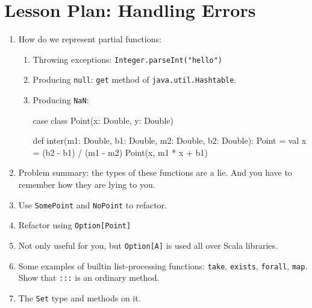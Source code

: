 \documentclass[9pt]{extbook}
\begin{document}
\chapter{Lesson Plan: Handling Errors}

\begin{enumerate}

  \item How do we represent partial functions:
  
    \begin{enumerate}
  
      \item Throwing exceptions: \lstinline|Integer.parseInt("hello")|
  
      \item Producing \lstinline|null|: \lstinline|get| method of
        \lstinline|java.util.Hashtable|.
  
      \item Producing \lstinline|NaN|:
  \begin{scalacode}
   case class Point(x: Double, y: Double)
  
   def inter(m1: Double, b1: Double, m2: Double, b2: Double): Point = {
     val x = (b2 - b1) / (m1 - m2)
     Point(x, m1 * x + b1)
   }
  \end{scalacode}
  
        
    \end{enumerate}
  
    \item Problem summary: the types of these functions are a lie. And
      you have to remember how they are lying to you.
  
    \item Use \lstinline|SomePoint| and \lstinline|NoPoint| to refactor.
  
    \item Refactor using \lstinline|Option[Point]|
  
    \item Not only useful for you, but \lstinline|Option[A]| is used all over
      Scala libraries.
  
    \item Some examples of builtin list-processing functions:
      \lstinline|take|, \lstinline|exists|, \lstinline|forall|,
      \lstinline|map|. Show that \lstinline|:::| is an ordinary method.
  
    \item The \lstinline|Set| type and methods on it.
  

\end{enumerate}
\end{document}
